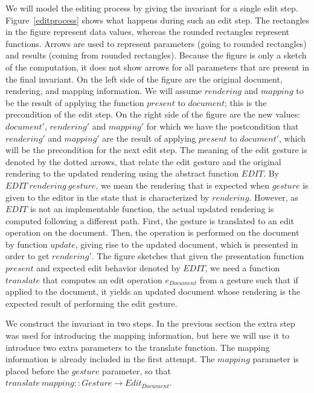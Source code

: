 \documentclass[twoside,epsf]{report}
\begin{document}
We will model the editing process by giving the invariant for a single edit step. Figure~\ref{editprocess} shows what happens during such an edit step. The rectangles in the figure represent data values, whereas the rounded rectangles represent functions. Arrows are used to represent parameters (going to rounded rectangles) and results (coming from rounded rectangles). Because the figure is only a sketch of the computation, it does not show arrows for all parameters that are present in the final invariant. On the left side of the figure are the original document, rendering, and mapping information. We will assume $rendering$ and $mapping$ to be the result of applying the function $present$ to $document$; this is the precondition of the edit step. On the right side of the figure are the new values: $document'$, $rendering'$ and $mapping'$ for which we have the postcondition that $rendering'$ and $mapping'$ are the result of applying $present$ to $document'$, which will be the precondition for the next edit step. The meaning of the edit gesture is denoted by the dotted arrows, that relate the edit gesture and the original rendering to the updated rendering using the abstract function $EDIT$. By $EDIT~rendering~gesture$, we mean the rendering that is expected when $gesture$ is given to the editor in the state that is characterized by $rendering$. However, as $EDIT$ is not an implementable function, the actual updated rendering is computed following a different path. First, the gesture is translated to an edit operation on the document. Then, the operation is performed on the document by function $update$, giving rise to the updated document, which is presented in order to get $rendering'$. The figure sketches that given the presentation function $present$ and expected edit behavior denoted by $EDIT$, we need a function $translate$ that computes an edit operation $e_{Document}$ from a gesture such that if applied to the document, it yields an updated document whose rendering is the expected result of performing the edit gesture.
        

We construct the invariant in two steps. In the previous section the extra step was used for introducing the mapping information, but here we will use it to introduce two extra parameters to the translate function. The mapping information is already included in the first attempt. The $mapping$ parameter is placed before the $gesture$ parameter, so that $translate~mapping :: Gesture \rightarrow Edit_{Document}$.
\end{document}
